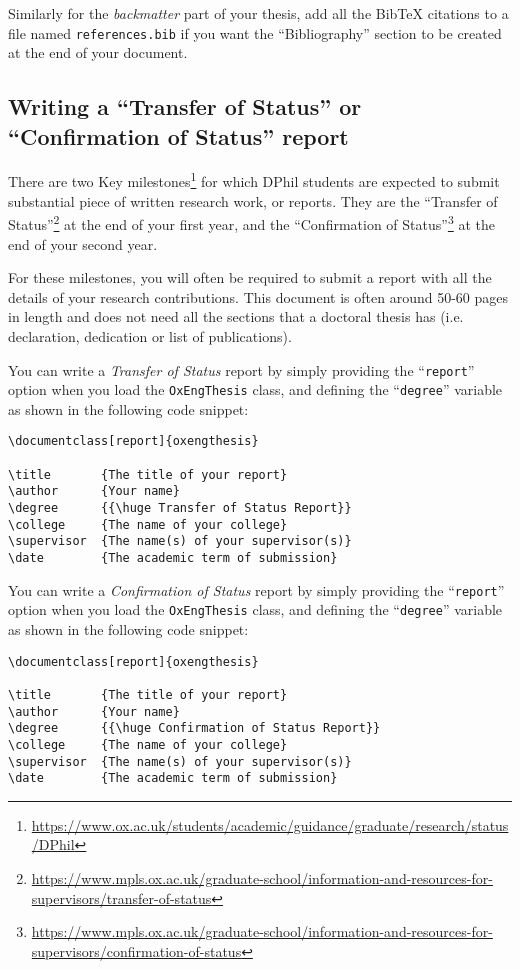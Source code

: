 Similarly for the \textit{backmatter} part of your thesis, add all the BibTeX citations to a file named \verb|references.bib| if you want the ``Bibliography'' section to be created at the end of your document. 


\subsection{Writing a ``Transfer of Status'' or ``Confirmation of Status'' report}


There are two Key milestones\footnote{\url{https://www.ox.ac.uk/students/academic/guidance/graduate/research/status/DPhil}} for which DPhil students are expected to submit substantial piece of written research work, or reports. They are the ``Transfer of Status''\footnote{\url{https://www.mpls.ox.ac.uk/graduate-school/information-and-resources-for-supervisors/transfer-of-status}} at the end of your first year, and the ``Confirmation of Status''\footnote{\url{https://www.mpls.ox.ac.uk/graduate-school/information-and-resources-for-supervisors/confirmation-of-status}} at the end of your second year. 

For these milestones, you will often be required to submit a report with all the details of your research contributions. This document is often around 50-60 pages in length and does not need all the sections that a doctoral thesis has (i.e. declaration, dedication or list of publications). 

You can write a \textit{Transfer of Status} report by simply providing the ``\verb|report|'' option when you load the \verb|OxEngThesis| class, and defining the ``\verb|degree|'' variable as shown in the following code snippet:


\begin{lstlisting}[style=custom-latex]
\documentclass[report]{oxengthesis}

\title       {The title of your report}
\author      {Your name}
\degree      {{\huge Transfer of Status Report}}
\college     {The name of your college}
\supervisor  {The name(s) of your supervisor(s)}
\date        {The academic term of submission}
\end{lstlisting}


You can write a \textit{Confirmation of Status} report by simply providing the ``\verb|report|'' option when you load the \verb|OxEngThesis| class, and defining the ``\verb|degree|'' variable as shown in the following code snippet:


\begin{lstlisting}[style=custom-latex]
\documentclass[report]{oxengthesis}

\title       {The title of your report}
\author      {Your name}
\degree      {{\huge Confirmation of Status Report}}
\college     {The name of your college}
\supervisor  {The name(s) of your supervisor(s)}
\date        {The academic term of submission}
\end{lstlisting}


